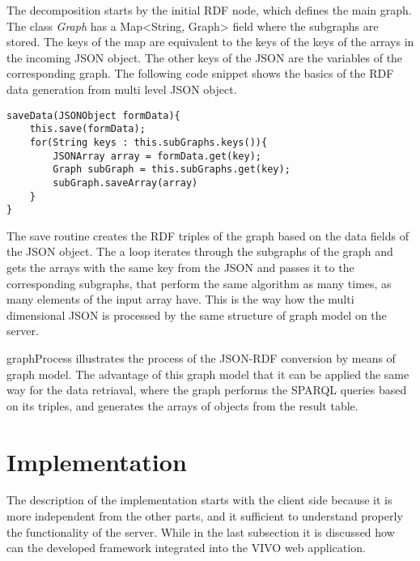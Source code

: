 
The decomposition starts by the initial RDF node, which defines the main graph. The class \textit{Graph} has a Map<String, Graph> field where the subgraphs are stored. The keys of the map are equivalent to the keys of the keys of the arrays in the incoming JSON object. The other keys of the JSON are the variables of the corresponding graph. The following code snippet shows the basics of the RDF data generation from multi level JSON object. 

\begin{lstlisting}[basicstyle=\footnotesize, frame=single, caption={Subform descriptor}, label=dataGeneration captionpos=b, belowskip=1em, aboveskip=2em]
saveData(JSONObject formData){
	this.save(formData);
	for(String keys : this.subGraphs.keys()){
		JSONArray array = formData.get(key);
		Graph subGraph = this.subGraphs.get(key);
		subGraph.saveArray(array)					
	}
}
\end{lstlisting}

The save routine creates the RDF triples of the graph based on the data fields of the JSON object. The a loop iterates through the subgraphs of the graph and gets the arrays with the same key from the JSON and passes it to the corresponding subgraphs, that perform the same algorithm as many times, as many elements of the input array have. This is the way how the multi dimensional JSON is processed by the same structure of graph model on the server. 

\figurename{graphProcess} illustrates the process of the JSON-RDF conversion by means of graph model. The advantage of this graph model that it can be applied the same way for the data retriaval, where the graph performs the SPARQL queries based on its triples, and generates the arrays of objects from the result table. 


\newpage
\section{Implementation} \label{52}

The description of the implementation starts with the client side because it is more independent from the other parts, and it sufficient to understand properly the functionality of the server. While in the last subsection it is discussed how can the developed framework integrated into the VIVO web application. 


